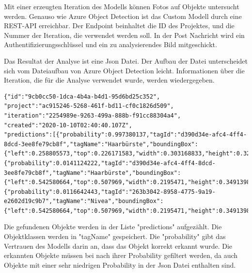 Mit einer erzeugten Iteration des Modells können Fotos auf Objekte untersucht werden. Genauso wie Azure Object Detection ist das Custom Modell durch eine REST-API erreichbar. 
Der Endpoint beinhaltet die ID des Projektes, und die Nummer der Iteration, die verwendet werden soll.
In der Post Nachricht wird ein Authentifizierungsschlüssel und ein zu analysierendes Bild mitgeschickt.

Das Resultat der Analyse ist eine Json Datei. 
Der Aufbau der Datei unterscheidet sich vom Dateiaufbau von Azure Object Detection leicht. Informationen über die Iteration, die für die Analyse verwendet wurde, werden wiedergegeben. 

\begin{lstlisting}
{"id":"9cb0cc50-1dca-4b4a-b4d1-95d6bd25c352",
"project":"ac915246-5268-461f-bd11-cf0c1826d509",
"iteration":"2254989e-9263-499a-888b-f91cc88304a4",
"created":"2020-10-10T02:40:40.107Z",
"predictions":[{"probability":0.997380137,"tagId":"d390d34e-afc4-4ff4-8dcd-3ee8fe79cb8f","tagName":"Haarbürste","boundingBox":{"left":0.258805573,"top":0.226171583,"width":0.303168833,"height":0.329167157}},
{"probability":0.0141124222,"tagId":"d390d34e-afc4-4ff4-8dcd-3ee8fe79cb8f","tagName":"Haarbürste","boundingBox":{"left":0.542580664,"top":0.507969,"width":0.2195471,"height":0.3491398}},
{"probability":0.0116642443,"tagId":"263b3042-8958-4775-9a19-e2602d19c9b7","tagName":"Nivea","boundingBox":{"left":0.542580664,"top":0.507969,"width":0.2195471,"height":0.3491398}}]}
\end{lstlisting}

Die gefundenen Objekte werden in der Liste "predictions" aufgezählt. Die Objektklassen werden in "tagName" gespeichert. Die "probability" gibt das Vertrauen des Modells darin an, dass das Objekt korrekt erkannt wurde. Die erkannten Objekte müssen bei nach ihrer Probability gefiltert werden, da auch Objekte mit einer sehr niedrigen Probability in der Json Datei enthalten sind. 